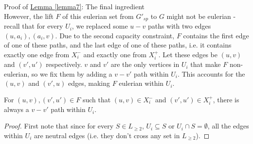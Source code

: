 \documentclass[./main.tex]{subfiles}
\begin{document}
\begin{subsection}{Proof of \hyperref[lemma7]{Lemma \ref{lemma7}}: The final ingredient}
	\\However, the lift $F$ of this eulerian set from $G'_{sp}$ to $G$ might not be eulerian - recall that for every $U_i$, we replaced some $u-v$ paths with two edges $(u,a_i),(a_i,v)$. 
	Due to the second capacity constraint, $F$ contains the first edge of one of these paths, and the last edge of one of these paths, i.e. it contains exactly one edge from $X_i^-$ and exactly one from $X_i^+$. 
	Let these edges be $(u,v)$ and $(v',u')$ respectively. 
	$v$ and $v'$ are the only vertices in $U_i$ that make $F$ non-eulerian, so we fix them by adding a $v-v'$ path within $U_i$. This accounts for the $(u,v)$ and $(v',u
	)$ edges, making $F$ eulerian within $U_i$.\vspace{1mm}
	\begin{claim}
	For $(u,v),(v',u')\in F$ such that $(u,v)\in X^-_i$ and $(v',u')\in X^+_i$, there is always a $v-v'$ path within $U_i$.
	\end{claim}
	\begin{proof}
		First note that since for every $S\in L_{\geq 2}$, $U_i\subseteq S$ or $U_i\cap S = \emptyset$, all the edges within $U_i$ are neutral edges (i.e. they don't cross any set in $L_{\geq 2}$). 
	\end{proof}
	
	
\end{subsection}
\end{document}
